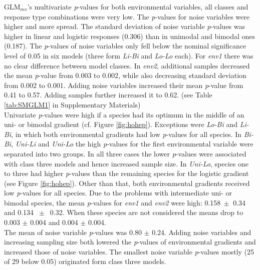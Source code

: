 		
		GLM$_{mv}$'s multivariate \textit{p}-values for both environmental variables, all classes and response type combinations were very low.
		The \textit{p}-values for noise variables were higher and more spread.
		The standard deviation of noise variable \textit{p}-values was higher in linear and logistic responses (0.306) than in unimodal and bimodal ones (0.187).
		The \textit{p}-values of noise variables only fell below the nominal significance level of 0.05 in six models (three form \textit{Li-Bi} and \textit{Lo-Lo} each).  
		For \textit{env1} there was no clear difference between model classes. 
		In \textit{env2}, additional samples decreased the mean \textit{p}-value from 0.003 to 0.002, while also decreasing standard deviation from 0.002 to 0.001. 
		Adding noise variables increased their mean \textit{p}-value from 0.41 to 0.57. 
		Adding samples further increased it to 0.62. (see Table \ref{tab:SMGLM1} in Supplementary Materials)\\


		Univariate \textit{p}-values were high if a species had its optimum in the middle of an uni- or bimodal gradient (cf. Figure \ref{fig:hohep}).
		Exceptions were \textit{Lo-Bi} and \textit{Li-Bi}, in which both environmental gradients had low \textit{p}-values for all species.
		In \textit{Bi-Bi}, \textit{Uni-Li} and \textit{Uni-Lo} the high \textit{p}-values for the first environmental variable were separated into two groups. 
		In all three cases the lower \textit{p}-values were associated with class three models and hence increased sample size.
		In \textit{Uni-Lo}, species one to three had higher \textit{p}-values than the remaining species for the logistic gradient (see Figure \ref{fig:hohep}).
		Other than that, both environmental gradients received low \textit{p}-values for all species.
		Due to the problems with intermediate uni- or bimodal species, the mean \textit{p}-values for \textit{env1} and \textit{env2} were high: 0.158$\ \pm$ 0.34 and 0.134 $\ \pm\ $ 0.32. 
		When these species are not considered the means drop to 0.003 $\pm$ 0.004 and 0.004 $\pm$ 0.004. \\
		The mean of noise variable \textit{p}-values was 0.80 $\pm$ 0.24. 
		Adding noise variables and increasing sampling size both lowered the \textit{p}-values of environmental gradients and increased those of noise variables. The smallest noise variable \textit{p}-values mostly (25 of 29 below 0.05) originated form class three models. 
		
